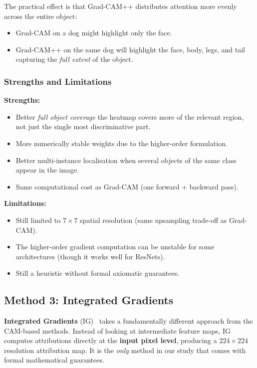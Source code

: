 \documentclass[12pt, a4paper]{article}
\begin{document}
The practical effect is that Grad-CAM++ distributes attention more evenly
across the entire object:
\begin{itemize}[leftmargin=*]
    \item Grad-CAM on a dog might highlight only the face.
    \item Grad-CAM++ on the same dog will highlight the face, body, legs, and
          tail capturing the \emph{full extent} of the object.
\end{itemize}

\subsubsection{Strengths and Limitations}

\textbf{Strengths:}
\begin{itemize}[leftmargin=*]
    \item Better \emph{full object coverage} the heatmap covers more of the
          relevant region, not just the single most discriminative part.
    \item More numerically stable weights due to the higher-order formulation.
    \item Better multi-instance localisation when several objects of the same
          class appear in the image.
    \item Same computational cost as Grad-CAM (one forward + backward pass).
\end{itemize}

\textbf{Limitations:}
\begin{itemize}[leftmargin=*]
    \item Still limited to $7 \times 7$ spatial resolution (same upsampling
          trade-off as Grad-CAM).
    \item The higher-order gradient computation can be unstable for some
          architectures (though it works well for ResNets).
    \item Still a heuristic without formal axiomatic guarantees.
\end{itemize}


\subsection{Method 3: Integrated Gradients}

\textbf{Integrated Gradients} (IG)~\cite{sundararajan2017ig} takes a
fundamentally different approach from the CAM-based methods.  Instead of
looking at intermediate feature maps, IG computes attributions directly at the
\textbf{input pixel level}, producing a $224 \times 224$ resolution attribution
map.  It is the \emph{only} method in our study that comes with formal
mathematical guarantees.
\end{document}
